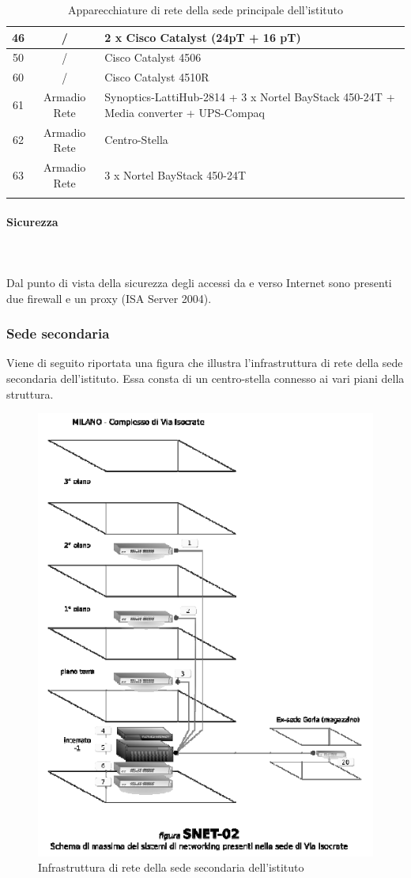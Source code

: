 \documentclass[12pt, a4paper, titlepage]{report}
\newcommand{\myparagraph}[1]{\paragraph{#1}\mbox{} \mbox{}}
\begin{document}
\begin{longtable}{| c | c | p{6cm} |}
		46 & / & 2 x Cisco Catalyst (24pT + 16 pT) \\ \hline
		50 & / & Cisco Catalyst 4506 \\ \hline
		60 & / & Cisco Catalyst 4510R \\ \hline
		61 & Armadio Rete & Synoptics-LattiHub-2814 + 3 x Nortel BayStack 450-24T + Media converter + UPS-Compaq \\ \hline
		62 & Armadio Rete & Centro-Stella \\ \hline
		63 & Armadio Rete & 3 x Nortel BayStack 450-24T \\ \hline
		\caption{Apparecchiature di rete della sede principale dell'istituto}
		\end{longtable}
	
	
	
		\myparagraph{Sicurezza}\\
		\\Dal punto di vista della sicurezza degli accessi da e verso Internet sono presenti due firewall e un proxy (ISA Server 2004).
		\newpage
		\subsubsection{Sede secondaria}
		
		Viene di seguito riportata una figura che illustra l'infrastruttura di rete della sede secondaria dell'istituto. Essa consta di un centro-stella connesso ai vari piani della struttura.
		\begin{figure}[h]
		\centering
		\includegraphics[scale=1]{./img/rete2.png}
		\caption{Infrastruttura di rete della sede secondaria dell'istituto}
		\end{figure}
		
\end{document}
